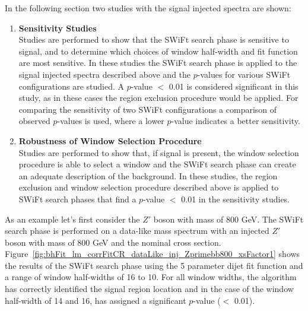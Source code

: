 \noindent
In the following section two studies with the signal injected spectra are shown:
\begin{enumerate}
  \item\textbf{Sensitivity Studies}\\
  Studies are performed to show that the SWiFt search phase is sensitive to signal,
  and to determine which choices of window half-width and fit function are most sensitive.
  In these studies the SWiFt search phase is applied to the signal injected spectra described above and
  the \bh{} \mbox{$p$-value}s for various SWiFt configurations are studied.
  A \mbox{$p$-value} $<$ 0.01 is considered significant in this study,
  as in these cases the region exclusion procedure would be applied.
  For comparing the sensitivity of two SWiFt configurations a comparison of
  observed \bh{} \mbox{$p$-value}s is used, where a lower \mbox{$p$-value} indicates a better sensitivity.\vspace{1em}
  
  \item\textbf{Robustness of Window Selection Procedure}\\
    Studies are performed to show that, if signal is present, the window selection procedure is able to select a window and
    the SWiFt search phase can create an adequate description of the background.
    In these studies, the region exclusion and window selection procedure described above is applied
    to SWiFt search phases that find a \bh{} \mbox{$p$-value} $<$ 0.01 in the sensitivity studies.
\end{enumerate}




As an example let's first consider the $Z'$ boson with mass of 800 GeV.
The SWiFt search phase is performed on a data-like mass spectrum
with an injected  $Z'$ boson with mass of 800 GeV and the nominal cross section.
Figure~\ref{fig:bhFit_lm_corrFitCR_dataLike_inj_Zprimebb800_xsFactor1}
shows the results of the SWiFt search phase
using the 5 parameter dijet fit function and a range of window half-widths of 16 to 10.
For all window widths, the \bh{} algorithm has correctly identified the signal region location
and in the case of the window half-width of 14 and 16, has assigned a significant \mbox{\mbox{$p$-value}} ($<$ 0.01).

